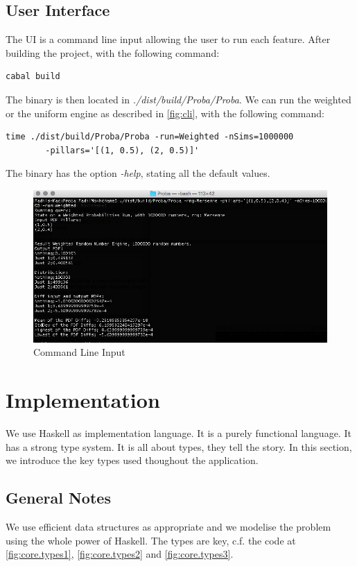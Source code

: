 \documentclass[12pt,a4paper,titlepage]{article}
\begin{document}
\subsection{User Interface}
The UI is a command line input allowing the user to run each feature.
After building the project, with the following command:
\begin{verbatim}
cabal build
\end{verbatim}
The binary is then located in \emph{./dist/build/Proba/Proba}.
We can run the weighted or the uniform engine
 as described in \autoref{fig:cli}, with the following command:
\begin{verbatim}
time ./dist/build/Proba/Proba -run=Weighted -nSims=1000000
        -pillars='[(1, 0.5), (2, 0.5)]'
\end{verbatim}
 The binary has the option \emph{-help}, stating all the default values.
\begin{figure}[h!]
\begin{center}
\includegraphics[width=1\textwidth]{img/cli.png}
\caption{Command Line Input}
\label{fig:cli}
\end{center}
\end{figure}

\section{Implementation}

We use Haskell as implementation language. It is a purely functional language.
It has a strong type system. It is all about types, they tell the story.
In this section, we introduce the key types used thoughout the application.

\subsection{General Notes}
We use efficient data structures as appropriate and we modelise the problem using
the whole power of Haskell. 
The types are key, c.f. the code at \autoref{fig:core.types1}, \autoref{fig:core.types2}
and \autoref{fig:core.types3}.
\end{document}
